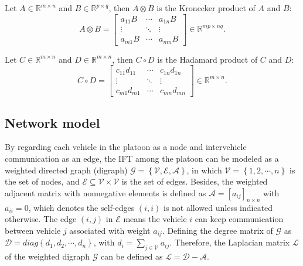 \documentclass[a4paper]{cas-sc}
\begin{document}
Let $A\in\mathbb{R}^{m\times n}$ and $B\in\mathbb{R}^{p\times q}$, then $A\otimes B$ is the Kronecker product of $A$ and $B$:
\begin{equation*}
  A \otimes B = \left[ {\begin{array}{*{20}{c}}
          {{a_{11}}B} & \cdots & {{a_{1n}}B} \\
          \vdots      & \ddots & \vdots      \\
          {{a_{m1}}B} & \cdots & {{a_{mn}}B}
        \end{array}} \right] \in {\mathbb{R}^{mp \times nq}}.
\end{equation*}

Let $C\in\mathbb{R}^{m\times n}$ and $D\in\mathbb{R}^{m\times n}$, then $C\circ D$ is the Hadamard product of $C$ and $D$:
\begin{equation*}
  C \circ D = \left[ {\begin{array}{*{20}{c}}
          {{c_{11}}{d_{11}}} & \cdots & {{c_{1n}}{d_{1n}}} \\
          \vdots             & \ddots & \vdots             \\
          {{c_{m1}}{d_{m1}}} & \cdots & {{c_{mn}}{d_{mn}}}
        \end{array}} \right] \in {\mathbb{R}^{m \times n}}.
\end{equation*}

\subsection{Network model}
\label{Section 2.1}

By regarding each vehicle in the platoon as a node and intervehicle communication as an edge, the IFT among the platoon can be modeled as a weighted directed graph (digraph) $\mathcal{G}=\left\{\mathcal{V}, \mathcal{E}, \mathcal{A}\right\}$, in which $\mathcal{V}=\left\{1,2,\cdots,n\right\}$ is the set of nodes, and $\mathcal{E}\subseteq\mathcal{V}\times\mathcal{V} $ is the set of edges. Besides, the weighted adjacent matrix with nonnegative elements is defined as $\mathcal{A}=[a_{ij}]_{n \times n}$ with $a_{ii}=0$, which denotes the self-edges $\left(i,i\right)$ is not allowed unless indicated otherwise. The edge $\left(i,j\right)$ in $\mathcal{E}$ means the vehicle $i$ can keep communication between vehicle $j$ associated with weight $a_{ij}$. Defining the degree matrix of $\mathcal{G}$ as $\mathcal{D}=diag\left\{d_1,d_2,\cdots,d_n\right\}$, with $d_i=\sum_{j\in\mathcal{V}} a_{ij}$. Therefore, the Laplacian matrix $\mathcal{L}$ of the weighted digraph $\mathcal{G}$ can be defined as $\mathcal{L}=\mathcal{D}-\mathcal{A}$.
\end{document}
